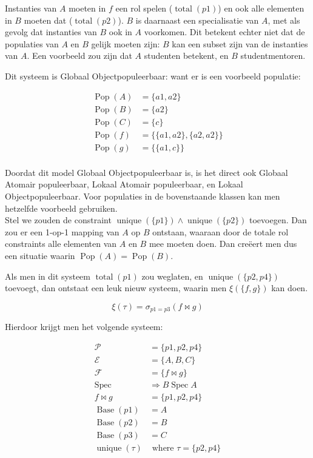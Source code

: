 \documentclass{article}
\newcommand{\Spec}{\ensuremath{\operatorname{Spec}}}
\newcommand{\Base}{\ensuremath{\operatorname{Base}}}
\newcommand{\total}{\ensuremath{\operatorname{total}}}
\newcommand{\unique}{\ensuremath{\operatorname{unique}}}
\newcommand{\Pop}{\ensuremath{\operatorname{Pop}}}
\begin{document}
Instanties van $A$ moeten in $f$ een rol spelen ($\total (p1)$) en ook alle
elementen in $B$ moeten dat ($\total (p2)$). $B$ is daarnaast een specialisatie
van $A$, met als gevolg dat instanties van $B$ ook in $A$ voorkomen. Dit
betekent echter niet dat de populaties van $A$ en $B$ gelijk moeten zijn: $B$
kan een subset zijn van de instanties van $A$. Een voorbeeld zou zijn dat $A$
studenten betekent, en $B$ studentmentoren.

Dit systeem is Globaal Objectpopuleerbaar: want er is een voorbeeld populatie:

\begin{align*}
  \Pop (A) & = \{a1,a2\}                 \\
  \Pop (B) & = \{a2\}                    \\
  \Pop (C) & = \{c\}                     \\
  \Pop (f) & = \{ \{a1,a2\}, \{a2,a2\}\} \\
  \Pop (g) & = \{ \{a1,c \} \}           \\
\end{align*}

Doordat dit model Globaal Objectpopuleerbaar is, is het direct ook Globaal
Atomair populeerbaar, Lokaal Atomair populeerbaar, en Lokaal
Objectpopuleerbaar. Voor populaties in de bovenstaande klassen kan men
hetzelfde voorbeeld gebruiken.\\


Stel we zouden de constraint $\operatorname{unique}(\{p1\}) \wedge
\operatorname{unique}(\{p2\})$ toevoegen. Dan zou er een 1-op-1 mapping van $A$
op $B$ ontstaan, waaraan door de totale rol constraints alle elementen van $A$
en $B$ mee moeten doen. Dan creëert men dus een situatie waarin
$\operatorname{Pop}(A)=\operatorname{Pop}(B)$.

Als men in dit systeem $\total (p1)$ zou weglaten, en $\operatorname{unique}
(\{p2,p4\})$ toevoegt, dan ontstaat een leuk nieuw systeem, waarin men $\xi
(\{f,g\})$ kan doen. 

\[
  \xi (\tau) = \sigma_{p1=p3} (f \bowtie g)
\]

Hierdoor krijgt men het volgende systeem:

\begin{align*}
  \mathcal{P} & = \{p1,p2,p4\}    \\
  \mathcal{E} & = \{A,B,C\}       \\
  \mathcal{F} & =  \{f\bowtie g\} \\
  \Spec &\Rightarrow B \Spec A    \\
  f \bowtie g & = \{p1,p2,p4\}    \\
  \Base (p1)  & = A               \\
  \Base (p2)  & = B               \\
  \Base (p3)  & = C               \\
  \unique (\tau) &\text{ where } \tau = \{p2,p4\} \\
\end{align*}
\end{document}
